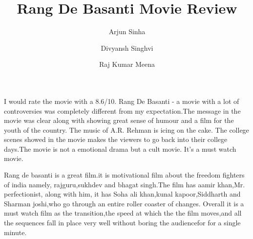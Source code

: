 \documentclass{article}
\title{Rang De Basanti Movie Review}
\author{Arjun Sinha
	\and
	Divyansh Singhvi
	\and
Raj Kumar Meena}
\begin{document}
\maketitle
I would rate the movie with a 8.6/10. Rang De Basanti - a movie with a lot of controversies was completely different from my expectation.The message in the movie was clear along with showing great sense of humour  and a film for the youth of the country. The music of A.R. Rehman is icing on the cake. The college scenes showed in the movie makes the viewers to go back into their college days.The movie is not a emotional drama but a cult movie. It's a must watch movie. 

Rang de basanti is a great film.it is motivational film about the freedom fighters of india namely, rajguru,sukhdev and bhagat singh.The film has aamir khan,Mr. perfectionist, along with him, it has Soha ali khan,kunal kapoor,Siddharth and Sharman joshi,who go through an entire roller coaster of changes.
Overall it is a must watch film as the transition,the speed at which the the film moves,and all the sequences fall in place very well without boring the audiencefor for a single minute.
\end{document}
